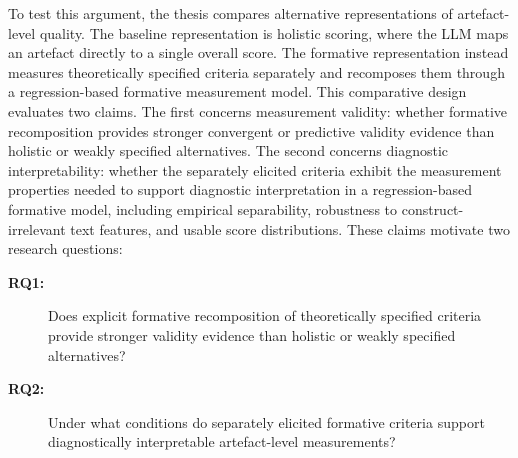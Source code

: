To test this argument, the thesis compares alternative representations of artefact-level quality. The baseline representation is holistic scoring, where the LLM maps an artefact directly to a single overall score. The formative representation instead measures theoretically specified criteria separately and recomposes them through a regression-based formative measurement model. This comparative design evaluates two claims. The first concerns measurement validity: whether formative recomposition provides stronger convergent or predictive validity evidence than holistic or weakly specified alternatives. The second concerns diagnostic interpretability: whether the separately elicited criteria exhibit the measurement properties needed to support diagnostic interpretation in a regression-based formative model, including empirical separability, robustness to construct-irrelevant text features, and usable score distributions. These claims motivate two research questions:

\begin{description}
\item[\textbf{RQ1:}] Does explicit formative recomposition of theoretically specified criteria provide stronger validity evidence than holistic or weakly specified alternatives?
\item[\textbf{RQ2:}] Under what conditions do separately elicited formative criteria support diagnostically interpretable artefact-level measurements?
\end{description}





